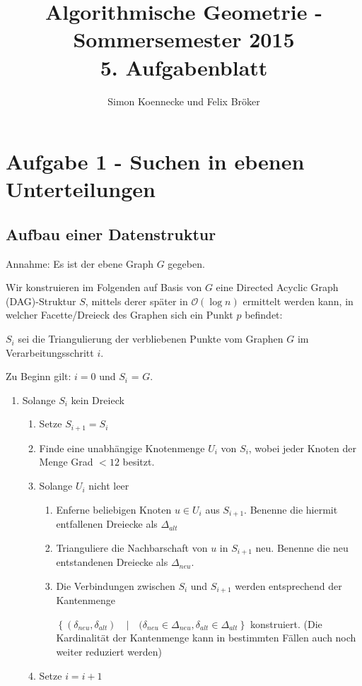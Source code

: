 \documentclass[a4paper]{article}
\begin{document}
\title{Algorithmische Geometrie - Sommersemester 2015\\
       5. Aufgabenblatt }
\author{Simon Koennecke und Felix Bröker}
\date{}
\maketitle

\section*{Aufgabe 1 - Suchen in ebenen Unterteilungen}
\subsection*{Aufbau einer Datenstruktur}
Annahme: Es ist der ebene Graph $G$ gegeben. 

Wir konstruieren im Folgenden auf Basis von $G$ eine Directed Acyclic Graph (DAG)-Struktur $S$, mittels derer 
später in $\mathcal{O}(\log n)$ ermittelt werden kann, in welcher Facette/Dreieck des Graphen
sich ein Punkt $p$ befindet:

$S_i$ sei die Triangulierung der verbliebenen Punkte vom Graphen $G$ im Verarbeitungsschritt $i$.

Zu Beginn gilt: $i = 0$ und $S_i$ = $G$.

\begin{enumerate}
 \item Solange $S_i$ kein Dreieck
 \begin{enumerate}
  \item Setze $S_{i+1} = S_i$
  \item Finde eine unabhängige Knotenmenge $U_i$ von $S_i$, wobei jeder Knoten der Menge Grad $< 12$ besitzt.
  \item Solange $U_i$ nicht leer
  \begin{enumerate}
   \item Enferne beliebigen Knoten $u \in U_i$ aus $S_{i+1}$. Benenne die hiermit entfallenen Dreiecke als $\Delta_{alt}$
   \item Trianguliere die Nachbarschaft von $u$ in $S_{i+1}$ neu. Benenne die neu entstandenen Dreiecke als $\Delta_{neu}$.
   \item Die Verbindungen zwischen $S_i$ und $S_{i+1}$ werden entsprechend der Kantenmenge
   
   $\left\{(\delta_{neu}, \delta_{alt}) \quad|\quad (\delta_{neu} \in \Delta_{neu}, \delta_{alt} \in \Delta_{alt} \right\}$ konstruiert.
   (Die Kardinalität der Kantenmenge kann in bestimmten Fällen auch noch weiter reduziert werden)
  \end{enumerate}
  \item Setze $i = i + 1$
 \end{enumerate}

\end{enumerate}
\end{document}
